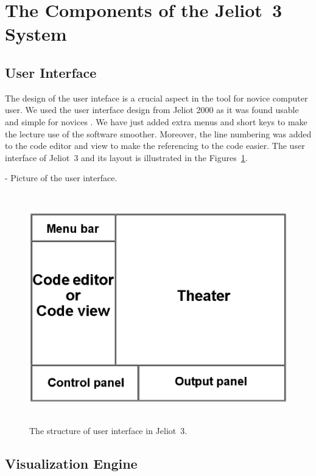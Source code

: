 \section{The Components of the Jeliot~3 System}
\label{sec:The_Components_of_the_Jeliot_3_System}


\subsection{User Interface}
\label{sec:User_Interface}

The design of the user inteface is a crucial aspect in the tool for novice computer user.
We used the user interface design from Jeliot 2000 as it was found usable and simple for novices \citep{Levy2003}.
We have just added extra menus and short keys to make the lecture use of
the software smoother. Moreover, the line numbering was added to the code editor and view to
make the referencing to the code easier. The user interface of Jeliot~3 and its layout is
illustrated in the Figures~\ref{fig:jeliot3_UI_structure}.

- Picture of the user interface.

\begin{figure}[!htb]
\begin{center}
\includegraphics[height=10cm]{jeliot3_UI_structure.eps}
\caption{The structure of user interface in Jeliot~3.}
\label{fig:jeliot3_UI_structure}
\end{center}
\end{figure}


\subsection{Visualization Engine}
\label{sec:Visualization_Engine}




